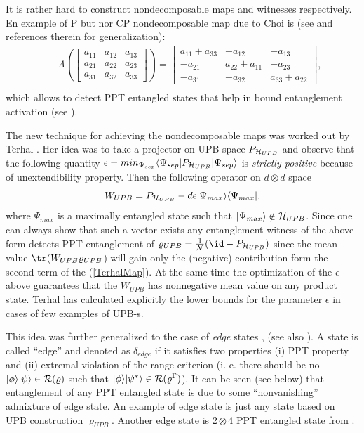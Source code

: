 \documentclass[twocolumn,aps,rmp]{revtex4}
\begin{document}
It is rather hard to construct nondecomposable maps and witnesses
respectively. En example of P but nor CP nondecomposable map due to
Choi is \cite{Choi82} (see \cite{Kossakowski} and references therein
for generalization):
\begin{eqnarray}
&&\Lambda( \left[ \begin{array}{ccc}
a_{11} & a_{12}& a_{13}  \\
a_{21} &a_{22}&a_{23}    \\
a_{31} &a_{32}& a_{33}
       \end{array}
      \right ])=
\left[ \begin{array}{ccc}
a_{11}+a_{33}  & - a_{12}& -a_{13}  \\
-a_{21} &a_{22}+ a_{11}& -a_{23}    \\
-a_{31} &-a_{32}& a_{33}+a_{22}
       \end{array}
      \right ], \nonumber \\
\end{eqnarray}
which allows to detect PPT entangled states that help in bound
entanglement activation (see \cite{activation}).

The new technique for achieving the nondecomposable maps was worked
out by Terhal \cite{Terhal2000-laa}. Her idea was to take a projector
on UPB space $P_{{\cal H}_{UPB}}$ and observe that the following
quantity $\epsilon = min_{\Psi_{sep}} \langle \Psi_{sep}|P_{{\cal
    H}_{UPB}} | \Psi_{sep} \rangle $ is {\it strictly positive}
because of unextendibility property. Then the following operator on $d
\otimes d$ space
\begin{equation}
W_{UPB}=P_{{\cal H}_{UPB}} - d \epsilon |\Psi_{max}\rangle \langle
\Psi_{max}|, \label{TerhalMap}
\end{equation}
where $\Psi_{max}$ is a maximally entangled state such that
$|\Psi_{max} \rangle \notin {\cal H}_{UPB} $. Since one can always
show that such a vector exists any entanglement witness of the above
form detects PPT entanglement of $\varrho_{UPB}= \frac{1}{\cal N}(\id
-P_{{\cal H}_{UPB}})$ since the mean value
${\tr}(W_{UPB}\varrho_{UPB}$) will gain only the (negative)
contribution form the second term of the (\ref{TerhalMap}). At the
same time the optimization of the $\epsilon$ above guarantees that the
$W_{UPB}$ has nonnegative mean value on any product state.  Terhal has
calculated explicitly the lower bounds for the parameter $\epsilon$ in
cases of few examples of UPB-s.

This idea was further generalized to the case of {\it edge} states
\cite{Lewenstein00a}, (see also
\cite{Karnas,Ho00,LewensteinSanpera-bsa}). A state is called ``edge''
and denoted as $\delta_{edge}$ if it satisfies two properties (i) PPT
property and (ii) extremal violation of the range criterion (i. e.
there should be no $|\phi \rangle| \psi\rangle \in {\cal R}(\varrho)$
such that $|\phi\rangle| \psi^{*}\rangle \in {\cal
  R}(\varrho^{\Gamma})$). It can be seen (see below) that entanglement
of any PPT entangled state is due to some ``nonvanishing'' admixture
of edge state. An example of edge state is just any state based on UPB
construction $\varrho_{UPB}$. Another edge state is $2 \otimes 4$ PPT
entangled state from \cite{Pawel97}.
\end{document}
